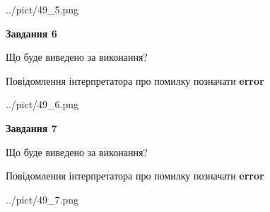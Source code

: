 \documentclass[10pt, ukrainian]{article}
\begin{document}
{\begin {large}
\begin{center}
	{../pict/49_5.png}
\end{center}
\newpage

{\begin {center}\textbf{Завдання 6}\end {center}}\par
Що буде виведено за виконання? \par
Повідомлення інтерпретатора про помилку позначати \textbf{error}

\begin{center}
	{../pict/49_6.png}
\end{center}
\newpage

{\begin {center}\textbf{Завдання 7}\end {center}}\par
Що буде виведено за виконання? \par
Повідомлення інтерпретатора про помилку позначати \textbf{error}

\begin{center}
	{../pict/49_7.png}
\end{center}
\newpage

\end {large}}
\end{document}
